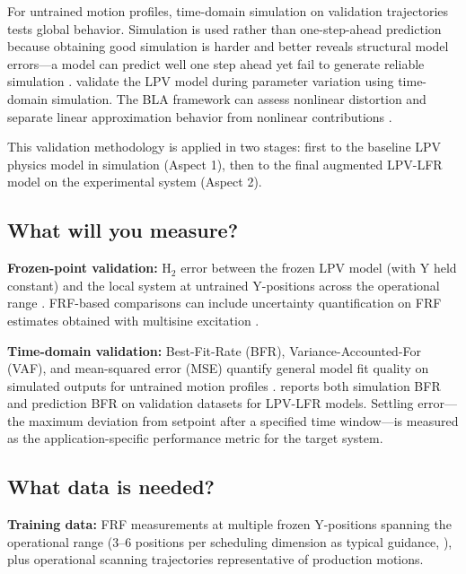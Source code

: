 For untrained motion profiles, time-domain simulation on validation trajectories tests global behavior. Simulation is used rather than one-step-ahead prediction because obtaining good simulation is harder and better reveals structural model errors---a model can predict well one step ahead yet fail to generate reliable simulation \citep{schoukens2019nonlinear}. \citet{paijmans2008identification} validate the LPV model during parameter variation using time-domain simulation. The BLA framework can assess nonlinear distortion and separate linear approximation behavior from nonlinear contributions \citep{schoukens2016linear}.

This validation methodology is applied in two stages: first to the baseline LPV physics model in simulation (Aspect 1), then to the final augmented LPV-LFR model on the experimental system (Aspect 2).

\subsection{What will you measure?}

\textbf{Frozen-point validation:} H$_2$ error between the frozen LPV model (with Y held constant) and the local system at untrained Y-positions across the operational range \citep{bachnas2014review}. FRF-based comparisons can include uncertainty quantification on FRF estimates obtained with multisine excitation \citep{gonzalez2025finite}.

\textbf{Time-domain validation:} Best-Fit-Rate (BFR), Variance-Accounted-For (VAF), and mean-squared error (MSE) quantify general model fit quality on simulated outputs for untrained motion profiles \citep{toth2010modeling, bachnas2014review}. \citet{drenth2025efficient} reports both simulation BFR and prediction BFR on validation datasets for LPV-LFR models. Settling error---the maximum deviation from setpoint after a specified time window---is measured as the application-specific performance metric for the target system.

\subsection{What data is needed?}

\textbf{Training data:} FRF measurements at multiple frozen Y-positions spanning the operational range (3--6 positions per scheduling dimension as typical guidance, \citet{bachnas2014review}), plus operational scanning trajectories representative of production motions.

